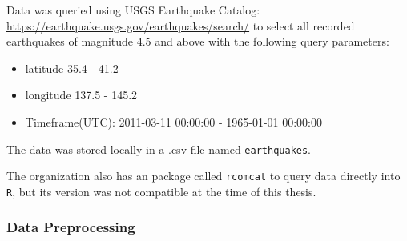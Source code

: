 
Data was queried using USGS Earthquake Catalog:
\url{https://earthquake.usgs.gov/earthquakes/search/} to select all
recorded earthquakes of magnitude 4.5 and above with the following query
parameters:

\begin{itemize}
\tightlist
\item
  latitude 35.4 - 41.2
\item
  longitude 137.5 - 145.2
\item
  Timeframe(UTC): 2011-03-11 00:00:00 - 1965-01-01 00:00:00
\end{itemize}

The data was stored locally in a .csv file named \texttt{earthquakes}.

The organization also has an package called \texttt{rcomcat} to query
data directly into \texttt{R}, but its version was not compatible at the
time of this thesis.

\hypertarget{data-preprocessing}{%
\subsubsection{Data Preprocessing}\label{data-preprocessing}}

